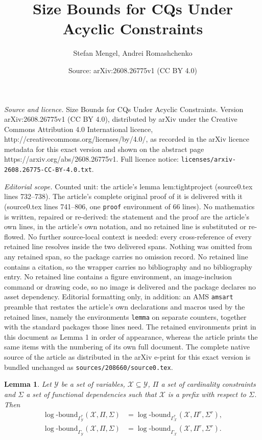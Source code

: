 \documentclass[10pt,a4paper]{amsart}
\title{Size Bounds for CQs Under Acyclic Constraints}
\author{Stefan Mengel, Andrei Romashchenko}
\date{Source: arXiv:2608.26775v1 (CC BY 4.0)}
\newtheorem{lemma}{Lemma}
\newcommand{\logb}{\mathrm{\log\text{-}bound}}
\newcommand{\vset}[1]{\mathcal{#1}}
\begin{document}
\maketitle

\noindent\emph{Source and licence.} Size Bounds for CQs Under Acyclic Constraints. Version arXiv:2608.26775v1 (CC BY 4.0), distributed by arXiv under the Creative Commons Attribution 4.0 International licence, http://creativecommons.org/licenses/by/4.0/, as recorded in the arXiv licence metadata for this exact version and shown on the abstract page https://arxiv.org/abs/2608.26775v1. Full licence notice: \texttt{licenses/arxiv-2608.26775-CC-BY-4.0.txt}.\par\smallskip

\noindent\textit{Editorial scope.} Counted unit: the article's lemma lem:tightproject (source0.tex lines 732--738). The article's complete original proof of it is delivered with it (source0.tex lines 741--806, one \texttt{proof} environment of 66 lines). No mathematics is written, repaired or re-derived: the statement and the proof are the article's own lines, in the article's own notation, and no retained line is substituted or re-flowed.  No further source-local context is needed: every cross-reference of every retained line resolves inside the two delivered spans.  Nothing was omitted from any retained span, so the package carries no omission record.  No retained line contains a citation, so the wrapper carries no bibliography and no bibliography entry.  No retained line contains a figure environment, an image-inclusion command or drawing code, so no image is delivered and the package declares no asset dependency.  Editorial formatting only, in addition: an AMS \texttt{amsart} preamble that restates the article's own declarations and macros used by the retained lines, namely the environments \texttt{lemma} on separate counters, together with the standard packages those lines need.  The retained environments print in this document as Lemma 1 in order of appearance, whereas the article prints the same items with the numbering of its own full document.  The complete native source of the article as distributed in the arXiv e-print for this exact version is bundled unchanged as \texttt{sources/208660/source0.tex}.
\begin{lemma}\label{lem:tightproject}
	Let $\vset Y$ be a set of variables, $\vset X\subseteq \vset Y$, $\Pi$ a set of cardinality constraints and $\Sigma$ a set of functional dependencies such that $\vset X$ is a prefix with respect to $\Sigma$. Then
	\begin{align*}
		\logb_{\Gamma^*_{\vset Y}}(\vset X, \Pi, \Sigma) &= \logb_{\Gamma^*_{\vset X}}(\vset X, \Pi^r, \Sigma^r),\\
		\logb_{\Gamma_{\vset Y}}(\vset X, \Pi, \Sigma) &= \logb_{\Gamma_{\vset X}}(\vset X, \Pi^r, \Sigma^r).
	\end{align*}
\end{lemma}
\end{document}
